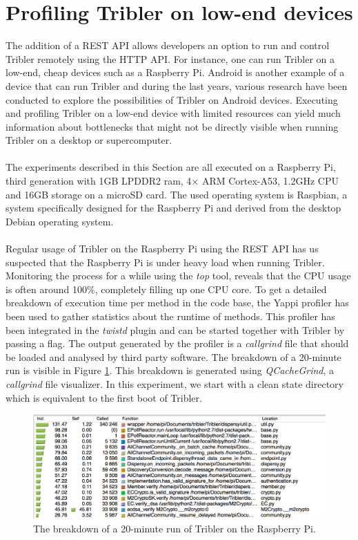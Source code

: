 \section{Profiling Tribler on low-end devices}
\label{sec:profiling_tribler_lowend}
The addition of a REST API allows developers an option to run and control Tribler remotely using the HTTP API. For instance, one can run Tribler on a low-end, cheap devices such as a Raspberry Pi. Android is another example of a device that can run Tribler and during the last years, various research have been conducted to explore the possibilities of Tribler on Android devices\cite{sabee2014tribler}\cite{de2014android}. Executing and profiling Tribler on a low-end device with limited resources can yield much information about bottlenecks that might not be directly visible when running Tribler on a desktop or supercomputer.\\\\
The experiments described in this Section are all executed on a Raspberry Pi, third generation with 1GB LPDDR2 ram, 4× ARM Cortex-A53, 1.2GHz CPU and 16GB storage on a microSD card. The used operating system is Raspbian, a system specifically designed for the Raspberry Pi and derived from the desktop Debian operating system.\\\\
Regular usage of Tribler on the Raspberry Pi using the REST API has us suspected that the Raspberry Pi is under heavy load when running Tribler. Monitoring the process for a while using the \emph{top} tool, reveals that the CPU usage is often around 100\%, completely filling up one CPU core. To get a detailed breakdown of execution time per method in the code base, the Yappi profiler has been used to gather statistics about the runtime of methods. This profiler has been integrated in the \emph{twistd} plugin and can be started together with Tribler by passing a flag. The output generated by the profiler is a \emph{callgrind} file that should be loaded and analysed by third party software. The breakdown of a 20-minute run is visible in Figure \ref{fig:yappi_breakdown}. This breakdown is generated using \emph{QCacheGrind}, a \emph{callgrind} file visualizer. In this experiment, we start with a clean state directory which is equivalent to the first boot of Tribler.

\begin{figure}[!h]
	\centering
	\includegraphics[width=0.9\columnwidth]{images/experiments/yappi_breakdown}
	\caption{The breakdown of a 20-minute run of Tribler on the Raspberry Pi.}
	\label{fig:yappi_breakdown}
\end{figure}

